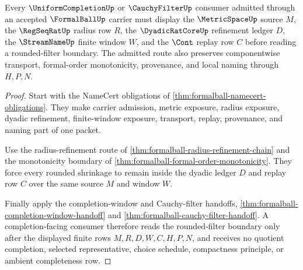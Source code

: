 \begin{theorem}
\label{thm:formalball-rounded-filter-admission}
Every $\UniformCompletionUp$ or $\CauchyFilterUp$ consumer admitted through an accepted $\FormalBallUp$ carrier must display the $\MetricSpaceUp$ source $M$, the $\RegSeqRatUp$ radius row $R$, the $\DyadicRatCoreUp$ refinement ledger $D$, the $\StreamNameUp$ finite window $W$, and the $\Cont$ replay row $C$ before reading a rounded-filter boundary. The admitted route also preserves componentwise transport, formal-order monotonicity, provenance, and local naming through $H,P,N$.
\end{theorem}
\begin{proof}
Start with the NameCert obligations of \autoref{thm:formalball-namecert-obligations}. They make carrier admission, metric exposure, radius exposure, dyadic refinement, finite-window exposure, transport, replay, provenance, and naming part of one packet.

Use the radius-refinement route of \autoref{thm:formalball-radius-refinement-chain} and the monotonicity boundary of \autoref{thm:formalball-formal-order-monotonicity}. They force every rounded shrinkage to remain inside the dyadic ledger $D$ and replay row $C$ over the same source $M$ and window $W$.

Finally apply the completion-window and Cauchy-filter handoffs, \autoref{thm:formalball-completion-window-handoff} and \autoref{thm:formalball-cauchy-filter-handoff}. A completion-facing consumer therefore reads the rounded-filter boundary only after the displayed finite rows $M,R,D,W,C,H,P,N$, and receives no quotient completion, selected representative, choice schedule, compactness principle, or ambient completeness row.
\end{proof}

